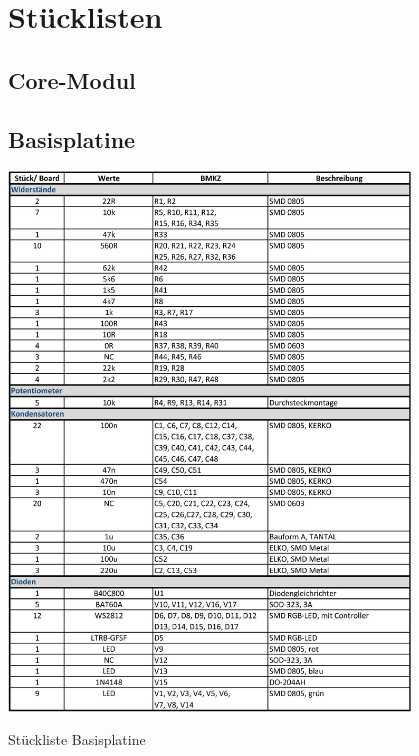 \section{Stücklisten}
\label{sec:stücklisten}

\subsection{Core-Modul}
\label{sec:stücklisten-core}

\subsection{Basisplatine}
\label{sec:stücklisten-basis}
\begin{table}[htb]
    \centering
    \includegraphics[width=0.8\textwidth]{Schuh/Pictures/stuck-basis1}
    \caption[Stückliste Basisplatine]{Stückliste \gls{Basisplatine}}
    \label{tab:stücklisten-basis}
\end{table}
